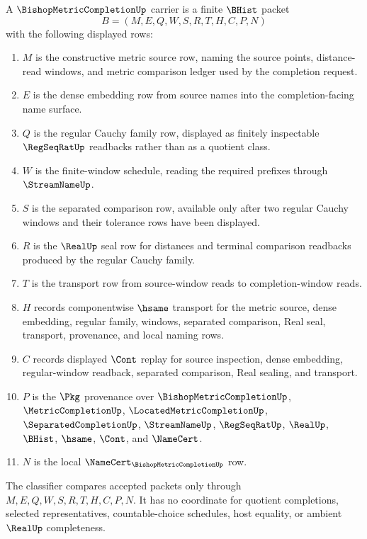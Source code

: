 \begin{definition}
\label{def:bishop-metric-completion-carrier}
A $\BishopMetricCompletionUp$ carrier is a finite $\BHist$ packet
$$
B=(M,E,Q,W,S,R,T,H,C,P,N)
$$
with the following displayed rows:
\begin{enumerate}
\item $M$ is the constructive metric source row, naming the source points, distance-read windows, and metric comparison ledger used by the completion request.
\item $E$ is the dense embedding row from source names into the completion-facing name surface.
\item $Q$ is the regular Cauchy family row, displayed as finitely inspectable $\RegSeqRatUp$ readbacks rather than as a quotient class.
\item $W$ is the finite-window schedule, reading the required prefixes through $\StreamNameUp$.
\item $S$ is the separated comparison row, available only after two regular Cauchy windows and their tolerance rows have been displayed.
\item $R$ is the $\RealUp$ seal row for distances and terminal comparison readbacks produced by the regular Cauchy family.
\item $T$ is the transport row from source-window reads to completion-window reads.
\item $H$ records componentwise $\hsame$ transport for the metric source, dense embedding, regular family, windows, separated comparison, Real seal, transport, provenance, and local naming rows.
\item $C$ records displayed $\Cont$ replay for source inspection, dense embedding, regular-window readback, separated comparison, Real sealing, and transport.
\item $P$ is the $\Pkg$ provenance over $\BishopMetricCompletionUp$, $\MetricCompletionUp$, $\LocatedMetricCompletionUp$, $\SeparatedCompletionUp$, $\StreamNameUp$, $\RegSeqRatUp$, $\RealUp$, $\BHist$, $\hsame$, $\Cont$, and $\NameCert$.
\item $N$ is the local $\NameCert_{\BishopMetricCompletionUp}$ row.
\end{enumerate}
The classifier compares accepted packets only through $M,E,Q,W,S,R,T,H,C,P,N$. It has no coordinate for quotient completions, selected representatives, countable-choice schedules, host equality, or ambient $\RealUp$ completeness.
\end{definition}

